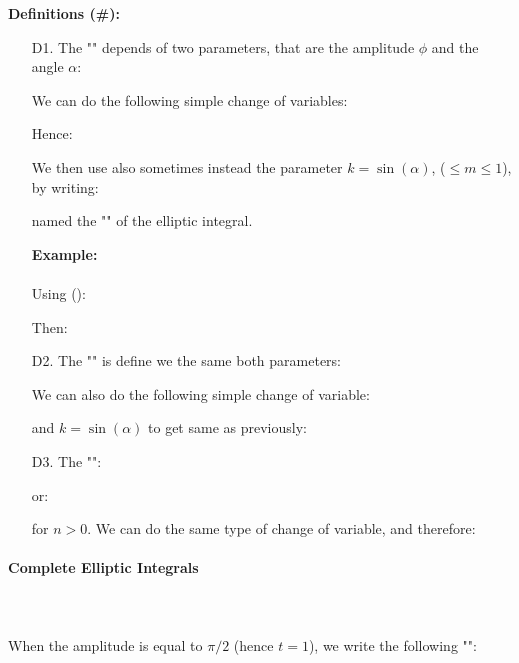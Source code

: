 	\textbf{Definitions (\#\mydef):}
	\begin{enumerate}
		\item[D1.] The "" depends of two parameters, that are the amplitude $\phi$ and the angle $\alpha$:
		
		We can do the following simple change of variables:
		
		Hence:
		
		We then use also sometimes instead the parameter $k=\sin(\alpha)$, ($\leq m \leq 1$), by writing:
		
		named the "" of the elliptic integral.
		
		\begin{tcolorbox}[colframe=black,colback=white,sharp corners]
		\textbf{{\Large {}}Example:}\\\\
		Using ():
		
		Then:
		
		\end{tcolorbox}
		
		\item[D2.] The "" is define we the same both parameters:
		
		We can also do the following simple change of variable:
		
		and $k=\sin(\alpha)$ to get same as previously:
		
	
		\item[D3.] The "":
		
		or:
		
		for $n>0$. We can do the same type of change of variable, and therefore:
		
	\end{enumerate}
	
	\paragraph{Complete Elliptic Integrals}\label{complete elliptic integrals}\mbox{}\\\\
	When the amplitude is equal to $\pi/2$ (hence $t=1$), we write the following "":
	
